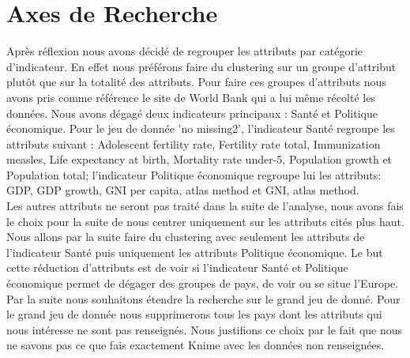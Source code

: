 \section{Axes de Recherche}
Après réflexion nous avons décidé de regrouper les attributs par catégorie d'indicateur. En effet nous préférons faire du clustering sur un groupe d'attribut plutôt que sur la totalité des attributs.
Pour faire ces groupes d'attributs nous avons pris comme référence le site de World Bank qui a lui même récolté les données. Nous avons dégagé deux indicateurs principaux : Santé et Politique économique. Pour le jeu de donnée 'no missing2', l'indicateur Santé regroupe les attributs suivant : Adolescent fertility rate, Fertility rate total, Immunization measles, Life expectancy at birth, Mortality rate under-5, Population growth et Population total; l'indicateur Politique économique regroupe lui les attributs: GDP, GDP growth, GNI per capita, atlas method et GNI, atlas method.\\
Les autres attributs ne seront pas traité dans la suite de l'analyse, nous avons fais le choix pour la suite de nous centrer uniquement sur les attributs cités plus haut.\\
Nous allons par la suite faire du clustering avec seulement les attributs de l'indicateur Santé puis uniquement les attributs Politique économique.
Le but cette réduction d'attributs est de voir si l'indicateur Santé et Politique économique permet de dégager des groupes de pays, de voir ou se situe l'Europe. Par la suite nous souhaitons étendre la recherche sur le grand jeu de donné. Pour le grand jeu de donnée nous supprimerons tous les pays dont les attributs qui nous intéresse ne sont pas renseignés. Nous justifions ce choix par le fait que nous ne savons pas ce que fais exactement Knime avec les données non renseignées. 